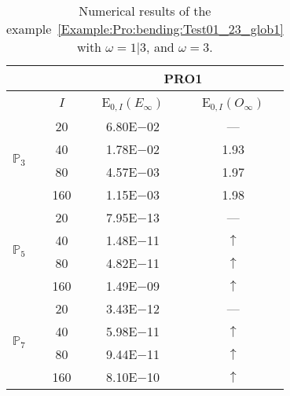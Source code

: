 \begin{table}[H]
\caption{Numerical results of the example~\ref{Example:Pro:bending:Test01_23_glob1} with $\omega=1|3$, and $\omega=3$.}
\setlength{\tabcolsep}{5pt}
\centering
\begin{tabular}{@{}l c c c@{}}
\toprule
 &  & \multicolumn{2}{c}{PRO1}\\
\midrule
 & $I$ & E$_{0,I}(E_{\infty})$ & E$_{0,I}(O_{\infty})$\\
\midrule
\multirow{4}{*}{$\mathbb{P}_{3}$} & 20 & 6.80E$-$02 & ---\\
 & 40 & 1.78E$-$02 & 1.93\\
 & 80 & 4.57E$-$03 & 1.97\\
 & 160 & 1.15E$-$03 & 1.98\\
\midrule
\multirow{4}{*}{$\mathbb{P}_{5}$} & 20 & 7.95E$-$13 & ---\\
 & 40 & 1.48E$-$11 & $\uparrow$\\
 & 80 & 4.82E$-$11 & $\uparrow$\\
 & 160 & 1.49E$-$09 & $\uparrow$\\
\midrule
\multirow{4}{*}{$\mathbb{P}_{7}$} & 20 & 3.43E$-$12 & ---\\
 & 40 & 5.98E$-$11 & $\uparrow$\\
 & 80 & 9.44E$-$11 & $\uparrow$\\
 & 160 & 8.10E$-$10 & $\uparrow$\\
\bottomrule
\end{tabular}
\label{Table:PRO:test_01_23_test11}
\end{table}
